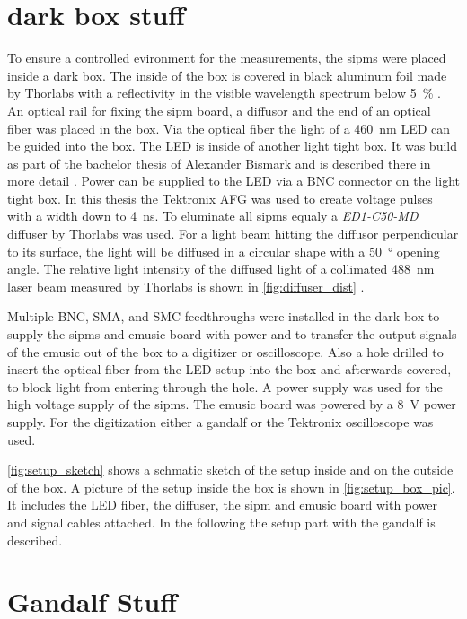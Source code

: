 \section{dark box stuff}
To ensure a controlled evironment for the measurements, the \acp{sipm} were placed inside a dark box.
The inside of the box is covered in black aluminum foil made by Thorlabs with a reflectivity in the visible wavelength spectrum below \SI{5}{\percent} \cite{}.
An optical rail for fixing the \ac{sipm} board, a diffusor and the end of an optical fiber was placed in the box.
Via the optical fiber the light of a \SI{460}{\nano\meter} LED can be guided into the box.
The LED is inside of another light tight box.
It was build as part of the bachelor thesis of Alexander Bismark and is described there in more detail \cite{}.
Power can be supplied to the LED via a BNC connector on the light tight box.
In this thesis the Tektronix AFG was used to create voltage pulses with a width down to \SI{4}{\nano\second}.
To eluminate all \acp{sipm} equaly a \textit{ED1-C50-MD} diffuser by Thorlabs was used.
For a light beam hitting the diffusor perpendicular to its surface, the light will be diffused in a circular shape with a \SI{50}{\degree} opening angle.
The relative light intensity of the diffused light of a collimated \SI{488}{\nano\meter} laser beam measured by Thorlabs is shown in \autoref{fig:diffuser_dist} \cite{}.

Multiple BNC, SMA, and SMC feedthroughs were installed in the dark box to supply the \acp{sipm} and \ac{emusic} board with power and to transfer the output signals of the \ac{emusic} out of the box to a digitizer or oscilloscope.
Also a hole drilled to insert the optical fiber from the LED setup into the box and afterwards covered, to block light from entering through the hole.
A power supply was used for the high voltage supply of the \acp{sipm}.
The \ac{emusic} board was powered by a \SI{8}{\volt} power supply.
For the digitization either a \ac{gandalf} or the Tektronix oscilloscope was used.

\autoref{fig:setup_sketch} shows a schmatic sketch of the setup inside and on the outside of the box.
A picture of the setup inside the box is shown in \autoref{fig:setup_box_pic}.
It includes the LED fiber, the diffuser, the \ac{sipm} and \ac{emusic} board with power and signal cables attached.
In the following the setup part with the \ac{gandalf} is described.

\section{Gandalf Stuff}

